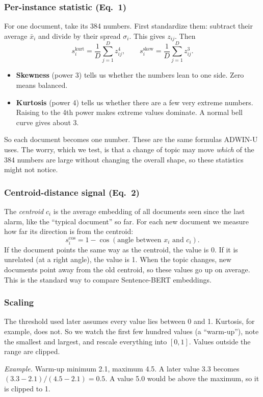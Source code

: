 \documentclass[11pt,a4paper]{article}
\begin{document}
\subsubsection*{Per-instance statistic (Eq.~1)}
For one document, take its 384 numbers. First standardize them: subtract their average $\bar x_i$ and divide by their spread $\sigma_i$. This gives $z_{ij}$. Then
\[
s_i^{\mathrm{kurt}}=\frac{1}{D}\sum_{j=1}^{D}z_{ij}^{4},\qquad s_i^{\mathrm{skew}}=\frac{1}{D}\sum_{j=1}^{D}z_{ij}^{3}.
\]
\begin{itemize}
\item \textbf{Skewness} (power 3) tells us whether the numbers lean to one side. Zero means balanced.
\item \textbf{Kurtosis} (power 4) tells us whether there are a few very extreme numbers. Raising to the 4th power makes extreme values dominate. A normal bell curve gives about 3.
\end{itemize}
So each document becomes one number. These are the same formulas ADWIN-U uses. The worry, which we test, is that a change of topic may move \emph{which} of the 384 numbers are large without changing the overall shape, so these statistics might not notice.

\subsubsection*{Centroid-distance signal (Eq.~2)}
The \emph{centroid} $c_i$ is the average embedding of all documents seen since the last alarm, like the ``typical document'' so far. For each new document we measure how far its direction is from the centroid:
\[
s_i^{\mathrm{cos}} = 1-\cos(\text{angle between } x_i \text{ and } c_i).
\]
If the document points the same way as the centroid, the value is 0. If it is unrelated (at a right angle), the value is 1. When the topic changes, new documents point away from the old centroid, so these values go up on average. This is the standard way to compare Sentence-BERT embeddings.

\subsubsection*{Scaling}
The threshold used later assumes every value lies between 0 and 1. Kurtosis, for example, does not. So we watch the first few hundred values (a ``warm-up''), note the smallest and largest, and rescale everything into $[0,1]$. Values outside the range are clipped.

\emph{Example.} Warm-up minimum 2.1, maximum 4.5. A later value 3.3 becomes $(3.3-2.1)/(4.5-2.1)=0.5$. A value 5.0 would be above the maximum, so it is clipped to 1.
\end{document}
